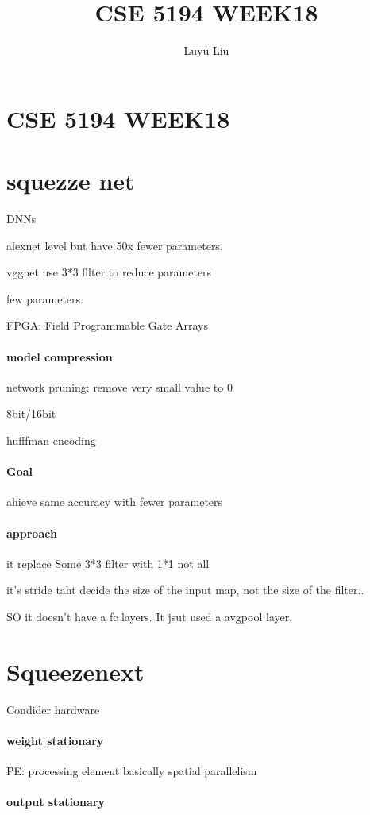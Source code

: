 \documentclass[12pt]{article}
\begin{document}
\author{Luyu Liu}

\newcommand\para{\par\refstepcounter{para}\thepara\space}

\section*{CSE 5194 WEEK18}
\title{CSE 5194 WEEK18}

\section{squezze net}
DNNs

alexnet level but have 50x fewer parameters.

vggnet use 3*3 filter to reduce parameters

few parameters:

FPGA: Field Programmable Gate Arrays

\paragraph{model compression}

network pruning: remove very small value to 0

8bit/16bit

hufffman encoding

\paragraph{Goal}
ahieve same accuracy with fewer parameters

\paragraph{approach}
it replace Some 3*3 filter with 1*1
not all

it's stride taht decide the size of the input map, not the size of the filter..

SO it doesn't have a fc layers. It jsut used a avgpool layer.


\section{Squeezenext}

Condider hardware

\paragraph{weight stationary}
PE: processing element
basically spatial parallelism



\paragraph{output stationary}
\end{document}
